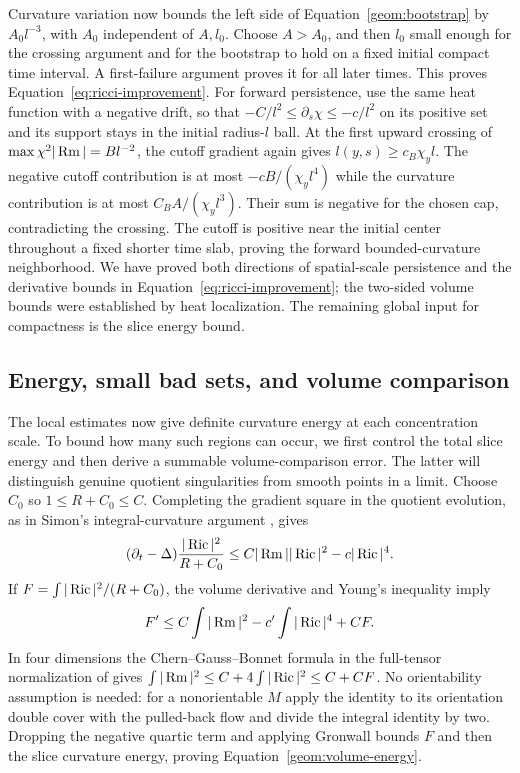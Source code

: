 Curvature variation now bounds the left side of
Equation~\eqref{geom:bootstrap} by $A_0 l^{-3}$, with $A_0$
independent of $A,l_0$. Choose $A>A_0$, and then $l_0$ small enough
for the crossing argument and for the bootstrap to hold on a fixed
initial compact time interval. A first-failure argument proves it for
all later times. This proves Equation~\eqref{eq:ricci-improvement}.
For forward persistence, use the same heat function with a negative
drift, so that $-C/l^2\leq\partial_s\chi\leq-c/l^2$ on its positive
set and its support stays in the initial radius-$l$ ball. At the
first upward crossing of $\max\chi^2|\operatorname{Rm}|=Bl^{-2}$, the cutoff
gradient again gives $l(y,s)\geq c_B\chi_y l$. The negative cutoff
contribution is at most $-cB/(\chi_y l^4)$ while the curvature
contribution is at most $C_BA/(\chi_y l^3)$. Their sum is negative
for the chosen cap, contradicting the crossing. The cutoff is
positive near the initial center throughout a fixed shorter time
slab, proving the forward bounded-curvature neighborhood. We have
proved both directions of spatial-scale persistence and the derivative
bounds in Equation~\eqref{eq:ricci-improvement}; the two-sided volume
bounds were established by heat localization. The remaining global
input for compactness is the slice energy bound.

\subsection{Energy, small bad sets, and volume comparison}
\label{geom:energy-comparison}

The local estimates now give definite curvature energy at each
concentration scale. To bound how many such regions can occur, we first
control the total slice energy and then derive a summable volume-comparison
error. The latter will distinguish genuine quotient singularities from
smooth points in a limit.
Choose $C_0$ so $1\leq R+C_0\leq C$. Completing the gradient square
in the quotient evolution, as in Simon's integral-curvature argument
\cite[Section~3, equation~(3.2) and Theorems~3.5--3.6]{SimonIntegral2020}, gives
\[
 (\partial_t-\Delta)\frac{|\operatorname{Ric}|^2}{R+C_0}
 \leq C|\operatorname{Rm}||\operatorname{Ric}|^2-c|\operatorname{Ric}|^4.
\]
If $F=\int|\operatorname{Ric}|^2/(R+C_0)$, the volume derivative and Young's
inequality imply
\[
 F'\leq C\int|\operatorname{Rm}|^2-c'\int|\operatorname{Ric}|^4+CF.
\]
In four dimensions the Chern--Gauss--Bonnet formula \cite{Chern1944}
in the full-tensor normalization of
\cite[Equation~(3.6)]{SimonIntegral2020} gives
$\int|\operatorname{Rm}|^2\leq C+4\int|\operatorname{Ric}|^2\leq C+CF$. No orientability
assumption is needed: for a nonorientable $M$ apply the identity to
its orientation double cover with the pulled-back flow and divide
the integral identity by two. Dropping the negative quartic
term and applying Gronwall bounds $F$ and then the slice curvature
energy, proving Equation~\eqref{geom:volume-energy}.

